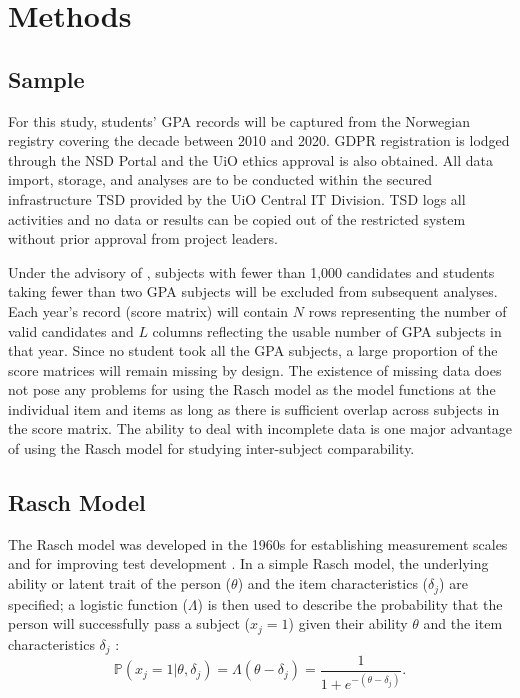 \documentclass[
    a4paper,            %
    11pt,               %
    stu,                %
    donotrepeattitle,   %
    noextraspace,       %
    floatsintext,       %
    biblatex,           %
    colorlinks=true,        %
    linkcolor=red,          %
    anchorcolor=black,      %
    citecolor=blue,         %
    urlcolor=blue,          %
    bookmarks=true,         %
    bookmarksopen=false,    %
    bookmarksnumbered=true  %
]{apa7}
\newcommand{\p}[1]{\mathbb{P}\left(#1\right)}
\begin{document}
\section{Methods}

\subsection{Sample}

For this study, students' GPA records will be captured from the Norwegian registry covering the decade between 2010 and 2020. GDPR registration is lodged through the NSD Portal and the UiO ethics approval is also obtained. All data import, storage, and analyses are to be conducted within the secured infrastructure TSD provided by the UiO Central IT Division. TSD logs all activities and no data or results can be copied out of the restricted system without prior approval from project leaders.

Under the advisory of \textcite{he:2015}, subjects with fewer than 1,000 candidates and students taking fewer than two GPA subjects will be excluded from subsequent analyses. Each year's record (score matrix) will contain $N$ rows representing the number of valid candidates and $L$ columns reflecting the usable number of GPA subjects in that year. Since no student took all the GPA subjects, a large proportion of the score matrices will remain missing by design. The existence of missing data does not pose any problems for using the Rasch model as the model functions at the individual item and items as long as there is sufficient overlap across subjects in the score matrix. The ability to deal with incomplete data is one major advantage of using the Rasch model for studying inter-subject comparability.

\subsection{Rasch Model}

The Rasch model was developed in the 1960s for establishing measurement scales and for improving test development \parencite{rasch:1980}. In a simple Rasch model, the underlying ability or latent trait of the person ($\theta$) and the item characteristics ($\delta_j$) are specified; a logistic function ($\Lambda$) is then used to describe the probability that the person will successfully pass a subject ($x_j=1$) given their ability $\theta$ and the item characteristics $\delta_j$ \parencite{deayala:2009}:
\begin{equation}\label{eq:di}
    \p{x_j = 1 | \theta, \delta_j} = \Lambda(\theta - \delta_j) = \frac{1}{1 + e^{- \left( \theta - \delta_j \right) } }.
\end{equation}
\end{document}
